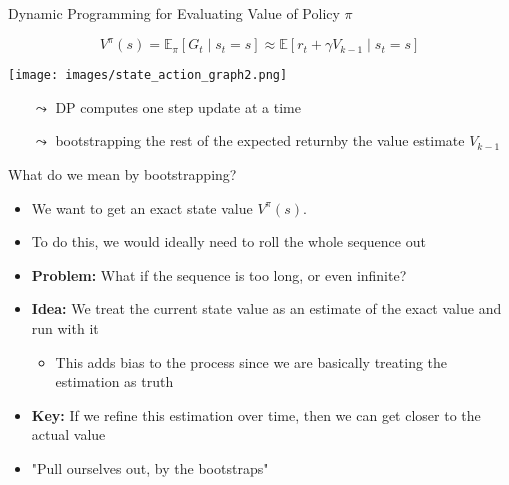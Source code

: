 \documentclass[aspectratio=169]{../latex_main/tntbeamer}  %
\begin{document}
\begin{frame}[c]{Dynamic Programming for Evaluating Value of Policy $\pi$}

$$V^\pi (s) = \mathbb{E}_\pi [G_t \mid s_t = s] \approx \mathbb{E} [r_t + \gamma V_{k-1} \mid s_t = s]$$

\begin{center}
	\texttt{[image: images/state\_action\_graph2.png]}
\end{center}

\vspace{-1cm}
\pause
\begin{itemize}
	\item[$\leadsto$] DP computes one step update at a time
	\item[$\leadsto$] bootstrapping the rest of the expected return\newline by the value estimate $V_{k-1}$
\end{itemize}

\end{frame}
\begin{frame}[c]{What do we mean by bootstrapping?}
\begin{itemize}
    \item We want to get an exact state value $V^\pi(s)$. 
    \item To do this, we would ideally need to roll the whole sequence out
    \item \textbf{Problem:} What if the sequence is too long, or even infinite? 
    \item \textbf{Idea:} We treat the current state value as an estimate of the exact value and run with it
    \begin{itemize}
        \item This adds bias to the process since we are basically treating the estimation as truth
    \end{itemize}
    \item \textbf{Key:} If we refine this estimation over time, then we can get closer to the actual value 
    \item \alert{"Pull ourselves out, by the bootstraps"    }
\end{itemize}
\end{frame}
\end{document}
